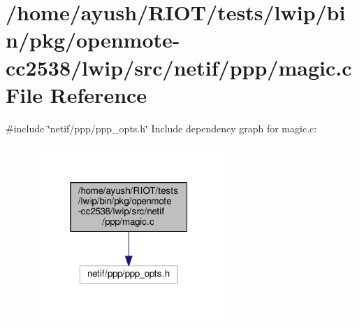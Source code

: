 \hypertarget{openmote-cc2538_2lwip_2src_2netif_2ppp_2magic_8c}{}\section{/home/ayush/\+R\+I\+O\+T/tests/lwip/bin/pkg/openmote-\/cc2538/lwip/src/netif/ppp/magic.c File Reference}
\label{openmote-cc2538_2lwip_2src_2netif_2ppp_2magic_8c}
{\ttfamily \#include \char`\"{}netif/ppp/ppp\+\_\+opts.\+h\char`\"{}}\newline
Include dependency graph for magic.\+c\+:
\nopagebreak
\begin{figure}[H]
\begin{center}
\leavevmode
\includegraphics[width=205pt]{openmote-cc2538_2lwip_2src_2netif_2ppp_2magic_8c__incl}
\end{center}
\end{figure}
